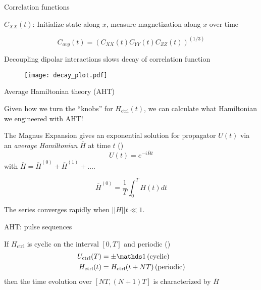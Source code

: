 \documentclass{beamer}
\begin{document}
\begin{frame}{Correlation functions}
%

$C_{XX}(t)$: Initialize state along $x$, measure magnetization along $x$ over time

\[
C_{avg}(t) = (C_{XX}(t) C_{YY}(t) C_{ZZ}(t))^{(1/3)}
\]

Decoupling dipolar interactions slows decay of correlation function

\begin{figure}
\centering
\texttt{[image: decay\_plot.pdf]}
\end{figure}



\end{frame}



\begin{frame}{Average Hamiltonian theory (AHT)}

Given how we turn the ``knobs'' for $H_\text{ctrl}(t)$, we can calculate what Hamiltonian we engineered with AHT!


The Magnus Expansion gives an exponential solution for propagator $U(t)$
via an \emph{average Hamiltonian} $\overline{H}$ at time $t$ (\cite{Blanes_2009,Magnus_Pedagogical})
\[
U(t) = e^{-i \overline{H} t}
\]
with $\overline{H} = \overline{H}^{(0)} + \overline{H}^{(1)} + \dots$.

\[
\overline{H}^{(0)} = \frac{1}{T} \int_0^{T}
    H(t) dt
\]

The series converges rapidly when $||H||t \ll 1$.

\end{frame}


\begin{frame}{AHT: pulse sequences}

If $H_{\text{ctrl}}$ is cyclic on the interval $[0,T]$ and periodic (\cite{gerstein-dybowski})
\begin{align*}
    U_{\text{ctrl}}(T) &= \pm \identity \, \text{(cyclic)} \\
    H_{\text{ctrl}}(t) &= H_{\text{ctrl}}(t + NT) \, \text{(periodic)}
\end{align*}
then the time evolution over $[NT, (N+1)T]$ is characterized by $\overline{H}$

\begin{figure}[H]
    \centering
    
\end{figure}

\end{frame}
\end{document}

